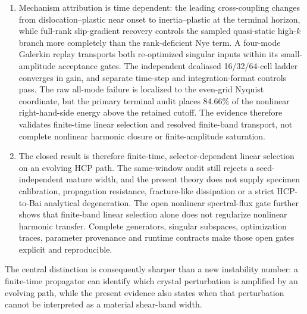 \begin{enumerate}
\item Mechanism attribution is time dependent: the leading cross-coupling
changes from dislocation--plastic near onset to inertia--plastic at the
terminal horizon, while full-rank slip-gradient recovery controls the sampled
quasi-static high-$k$ branch more completely than the rank-deficient Nye term.
A four-mode Galerkin replay transports both re-optimized singular inputs
within its small-amplitude acceptance gates.  The independent dealiased
16/32/64-cell ladder converges in gain, and separate time-step and
integration-format controls pass.  The raw all-mode failure is localized to
the even-grid Nyquist coordinate, but the primary terminal audit places
84.66\% of the nonlinear right-hand-side energy above the retained cutoff.  The evidence therefore
validates finite-time linear selection and resolved finite-band transport, not
complete nonlinear harmonic closure or finite-amplitude saturation.

\item The closed result is therefore finite-time, selector-dependent linear
selection on an evolving HCP path. The same-window audit still rejects a
seed-independent mature width, and the present theory does not supply
specimen calibration, propagation resistance, fracture-like dissipation or a
strict HCP-to-Bai analytical degeneration.  The open nonlinear spectral-flux
gate further shows that finite-band linear selection alone does not regularize
nonlinear harmonic transfer. Complete generators, singular
subspaces, optimization traces, parameter provenance and runtime contracts
make those open gates explicit and reproducible.
\end{enumerate}

The central distinction is consequently sharper than a new instability
number: a finite-time propagator can identify which crystal perturbation is
amplified by an evolving path, while the present evidence also states when
that perturbation cannot be interpreted as a material shear-band width.
